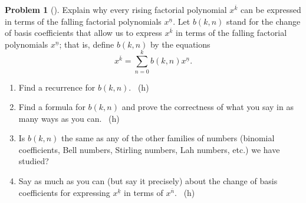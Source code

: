 \documentclass[10pt,]{book}
\theoremstyle{plain}
\theoremstyle{definition}
\newtheorem{activity}[project]{Problem}
\theoremstyle{definition}
\numberwithin{equation}{chapter}
\newcommand{\importantarrow}{\Rightarrow}
\begin{document}
\begin{activity}[]\marginsymbol[-1em]{\pdftooltip{$\importantarrow$}{especially interesting}} \label{activity-156}
\hypertarget{p-874}{}%
Explain why every rising factorial polynomial \(x^{\overline{k}}\) can be expressed in terms of the falling factorial polynomials \(x^{\underline{n}}\). Let \(b(k,n)\) stand for the change of basis coefficients that allow us to express \(x^{\overline{k}}\) in terms of the falling factorial polynomials \(x^{\underline{n}}\); that is, define \(b(k,n)\) by the equations%
\begin{equation*}
x^{\overline{k}}=\sum_{n=0}^k b(k,n) x^{\underline{n}}.
\end{equation*}
%
\begin{enumerate}[font=\bfseries,label=(\alph*),ref=\alph*]
\item\label{task-113} \marginsymbol[-2.5em]{} \hypertarget{p-875}{}%
Find a recurrence for \(b(k,n)\).%
~{\tiny (h)}\item\label{task-114} \marginsymbol[-2.5em]{} \hypertarget{p-879}{}%
Find a formula for \(b(k,n)\) and prove the correctness of what you say in as many ways as you can.%
~{\tiny (h)}\item\label{task-115} \marginsymbol[-2.5em]{} \hypertarget{p-883}{}%
Is \(b(k,n)\) the same as any of the other families of numbers (binomial coefficients, Bell numbers, Stirling numbers, Lah numbers, etc.) we have studied?%
\item\label{task-116} \marginsymbol[-2.5em]{} \hypertarget{p-885}{}%
Say as much as you can (but say it precisely) about the change of basis coefficients for expressing \(x^{\underline{k}}\) in terms of \(x^{\overline{n}}\).%
~{\tiny (h)}\end{enumerate}
\end{activity}
\typeout{************************************************}
\typeout{************************************************}
\end{document}
